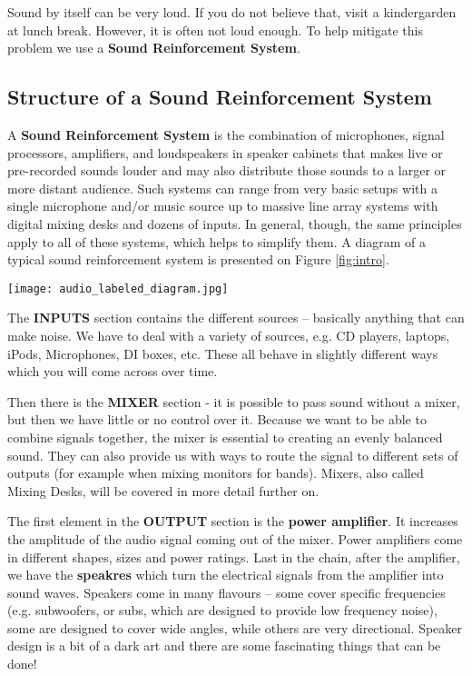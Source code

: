 \documentclass[14pt]{article} %
\let\Oldsubsection\subsection
\renewcommand{\subsection}{\FloatBarrier\Oldsubsection}
\begin{document}
Sound by itself can be very loud. If you do not believe that, visit a kindergarden at lunch break. However, it is often not loud enough. To help mitigate this problem we use a \textbf{Sound Reinforcement System}. 

\subsection{Structure of a Sound Reinforcement System}
\label{sound-system-structure}
A \textbf{Sound Reinforcement System} is the combination of microphones, signal processors, amplifiers, and loudspeakers in speaker cabinets that makes live or pre-recorded sounds louder and may also distribute those sounds to a larger or more distant audience. Such systems can range from very basic setups with a single microphone and/or music source up to massive line array systems with digital mixing desks and dozens of inputs. In general, though, the same principles apply to all of these systems, which helps to simplify them. A diagram of a typical sound reinforcement system is presented on Figure \ref{fig:intro}.

\begin{figure*}[h]
\begin{center}

\texttt{[image: audio\_labeled\_diagram.jpg]}
\caption{Basic structure of a sound system.}
\label{fig:intro}

\end{center}
\end{figure*}

The \textbf{INPUTS} section contains the different sources – basically anything that can make noise. We have to deal with a variety of sources, e.g. CD players, laptops, iPods, Microphones, DI boxes, etc. These all behave in slightly different ways which you will come across over time.

Then there is the \textbf{MIXER} section - it is possible to pass sound without a mixer, but then we have little or no control over it. Because we want to be able to combine signals together, the mixer is essential to creating an evenly balanced sound. They can also provide us with ways to route the signal to different sets of outputs (for example when mixing monitors for bands). Mixers, also called Mixing Desks, will be covered in more detail further on.

The first element in the \textbf{OUTPUT} section is the \textbf{power amplifier}. It increases the amplitude of the audio signal coming out of the mixer. Power amplifiers come in different shapes, sizes and power ratings. Last in the chain, after the amplifier, we have the \textbf{speakres} which turn the electrical signals from the amplifier into
sound waves. Speakers come in many flavours – some cover specific frequencies (e.g. subwoofers, or subs, which are designed to provide low frequency noise), some are designed to cover wide angles, while others are very directional. Speaker design is a bit of a dark art and there are some fascinating things that can be done!
\end{document}
